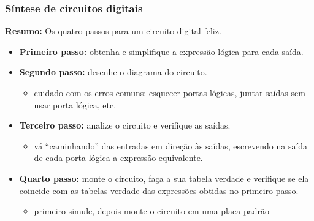 \documentclass{beamer}
\begin{document}
\begin{frame}
\frametitle{Síntese de circuitos digitais}

\textbf{Resumo: } Os quatro passos para um circuito digital feliz.

\begin{itemize}

\item \textbf{Primeiro passo: } obtenha e simplifique a expressão lógica para cada saída.

\pause

\item \textbf{Segundo passo: } desenhe o diagrama do circuito.

\pause

\begin{itemize}
\item cuidado com os erros comuns: esquecer portas lógicas, juntar saídas sem
usar porta lógica, etc.
\end{itemize}

\pause

\item \textbf{Terceiro passo: } analize o circuito e verifique as saídas.

\pause

\begin{itemize}
\item vá ``caminhando'' das entradas em direção às
saídas, escrevendo na saída de cada porta lógica a expressão equivalente.
\end{itemize}

\pause

\item \textbf{Quarto passo: } monte o circuito, faça a sua tabela verdade e
verifique se ela coincide com as tabelas verdade das expressões obtidas
no primeiro passo.

\pause

\begin{itemize}
\item primeiro simule, depois monte o circuito em uma placa padrão
\end{itemize}

\end{itemize}

\end{frame}

\end{document}
